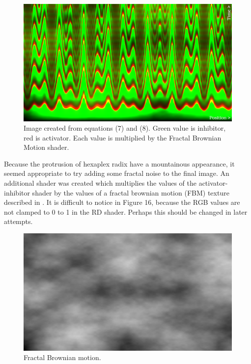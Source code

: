 \documentclass[a4paper]{article}
\begin{document}
\begin{figure}[h]
	\centering\includegraphics[scale=0.8]{./img/meinhardt-hexaplex-activator-inhibitor.png}
	\caption{Image created from equations (7) and (8). Green value is inhibitor, red is activator. Each value is multiplied by the Fractal Brownian Motion shader. \cite{rd-fbm}}
	\label{activator-inhibitor} %
\end{figure}

Because the protrusion of hexaplex radix have a mountainous appearance, it seemed appropriate to try adding some fractal noise to the final image. An additional shader was created which multiplies the values of the activator-inhibitor shader by the values of a fractal brownian motion (FBM) texture described in \cite{fbm}. It is difficult to notice in Figure 16, because the RGB values are not clamped to 0 to 1 in the RD shader. Perhaps this should be changed in later attempts.

\begin{figure}[h]
\centering\includegraphics[scale=0.2]{./img/fbm.png}
\caption{Fractal Brownian motion. \cite{st-fbm}}
\label{fbm} %
\end{figure}
\end{document}

